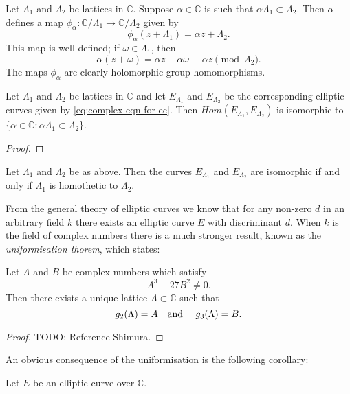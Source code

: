 Let $\Lambda_{1}$ and $\Lambda_{2}$ be lattices in $\mathbb{C}$. Suppose $\alpha \in
\mathbb{C}$ is such that $\alpha\Lambda_{1} \subset \Lambda_{2}$.  Then $\alpha$
defines a map $\phi_{\alpha} \colon \mathbb{C}/\Lambda_{1} \rightarrow
\mathbb{C}/\Lambda_{2}$ given by
\begin{equation*}
  \phi_{\alpha}(z + \Lambda_{1}) = \alpha z + \Lambda_{2}.
\end{equation*}
This map is well defined; if $\omega \in \Lambda_{1}$, then
\begin{equation*}
  \alpha(z + \omega) = \alpha z + \alpha\omega \equiv \alpha z \pmod{\Lambda_{2}}.
\end{equation*}
The maps $\phi_{\alpha}$ are clearly holomorphic group homomorphisms.

\begin{prop}
  \label{prop:complex-isogenies}
  Let $\Lambda_{1}$ and $\Lambda_{2}$ be lattices in $\mathbb{C}$ and let
  $E_{\Lambda_{1}}$ and $E_{\Lambda_{2}}$ be the corresponding elliptic curves given
  by \eqref{eq:complex-eqn-for-ec}.  Then
  $Hom(E_{\Lambda_{1}},E_{\Lambda_{2}})$ is isomorphic to $\{\alpha \in \mathbb{C}
  \colon \alpha\Lambda_{1} \subset \Lambda_{2}\}$.
\end{prop}
\begin{proof}
  
\end{proof}

\begin{cor}
  \label{cor:homothetic-lattices-give-isomorphic-curves}
  Let $\Lambda_{1}$ and $\Lambda_{2}$ be as above.  Then the curves $E_{\Lambda_{1}}$
  and $E_{\Lambda_{2}}$ are isomorphic if and only if $\Lambda_{1}$ is homothetic to $\Lambda_{2}$.
\end{cor}

From the general theory of elliptic curves we know that for any non-zero $d$ in an
arbitrary field $k$ there exists an elliptic curve $E$ with discriminant $d$.  When
$k$ is the field of complex numbers there is a much stronger result, known as the
\emph{uniformisation thorem}, which states:

\begin{thm}
  \label{thm:uniformisation-theorem}
  Let $A$ and $B$ be complex numbers which satisfy
  \begin{equation*}
    A^{3} - 27B^{2} \neq 0.
  \end{equation*}
  Then there exists a unique lattice $\Lambda \subset \mathbb{C}$ such that
  \begin{equation*}
    g_{2}(\Lambda) = A \text{\quad and \quad} g_{3}(\Lambda) = B.
  \end{equation*}
\end{thm}
\begin{proof}
  TODO: Reference Shimura.
\end{proof}

An obvious consequence of the uniformisation is the following corollary:

\begin{cor}
  \label{cor:uniformisation-corollary}
  Let $E$ be an elliptic curve over $\mathbb{C}$.
\end{cor}

